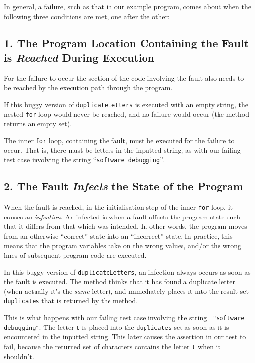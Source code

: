 In general, a failure, such as that in our example program, comes about when the
following three conditions are met, one after the other:


\subsection*{1. The Program Location Containing the Fault is {\it Reached}
During Execution}

For the failure to occur the section of the code involving the fault also needs
to be reached by the execution path through the program. 


If this buggy version of {\tt duplicateLetters} is executed with an empty string,
the nested {\tt for} loop would never be reached, and no failure would occur
(the method returns an empty set). 

The inner {\tt for} loop, containing the fault, must be executed for the failure
to occur. That is, there must be letters in the inputted string, as with our
failing test case involving the string ``{\tt software debugging}''.


\subsection*{2. The Fault {\it Infects} the State of the Program}


When the fault is reached, in the initialisation step of the inner {\tt for}
loop, it causes an {\it infection}. An infected is when a fault affects the
program state such that it differs from that which was intended. In other words,
the program moves from an otherwise ``correct'' state into an ``incorrect''
state. In practice, this means that the program variables take on the wrong
values, and/or the wrong lines of subsequent program code are executed.

In this buggy version of {\tt duplicateLetters}, an infection always occurs as
soon as the fault is executed. The method thinks that it has found a duplicate
letter (when actually it's the {\it same} letter), and immediately places it
into the result set {\tt duplicates} that is returned by the method.

This is what happens with our failing test case involving the string {\tt
"software debugging"}. The letter {\tt t} is placed into the {\tt duplicates}
set as soon as it is encountered in the inputted string. This later causes the
assertion in our test to fail, because the returned set of characters contains
the letter {\tt t} when it shouldn't.

